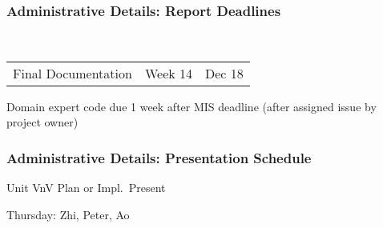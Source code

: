 \documentclass[t,12pt,numbers,fleqn]{beamer}
\begin{document}



\begin{frame}
\frametitle{Administrative Details: Report Deadlines}
~\newline
\begin{tabular}{l l l}
Final Documentation & Week 14 & Dec 18\\
\end {tabular}

\bi
\item Domain expert code due 1 week after MIS deadline (after assigned issue by
  project owner)
\ei

\end{frame}


\begin{frame}
\frametitle{Administrative Details: Presentation Schedule}

\bi
\item Unit VnV Plan or Impl.\ Present
\bi
\item Thursday: Zhi, Peter, Ao
\ei
\ei

\end{frame}

\end{document}
